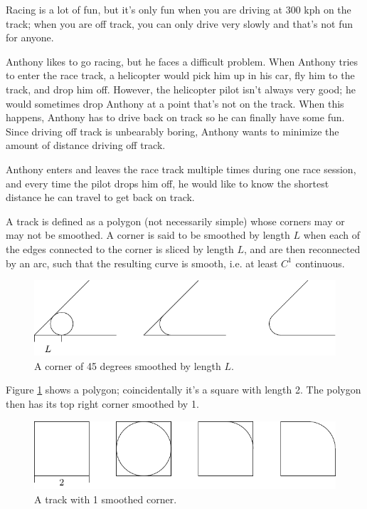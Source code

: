 
Racing is a lot of fun, but it's only fun when you are driving at 300 kph on the track; when you are off track, you can only drive very slowly and that's not fun for anyone.

Anthony likes to go racing, but he faces a difficult problem. When Anthony tries to enter the race track, a helicopter would pick him up in his car, fly him to the track, and drop him off. However, the helicopter pilot isn't always very good; he would sometimes drop Anthony at a point that's not on the track. When this happens, Anthony has to drive back on track so he can finally have some fun. Since driving off track is unbearably boring, Anthony wants to minimize the amount of distance driving off track.

Anthony enters and leaves the race track multiple times during one race session, and every time the pilot drops him off, he would like to know the shortest distance he can travel to get back on track.

A track is defined as a polygon (not necessarily simple) whose corners may or may not be smoothed. A corner is said to be smoothed by length $L$ when each of the edges connected to the corner is sliced by length $L$, and are then reconnected by an arc, such that the resulting curve is smooth, i.e. at least $C^1$ continuous.

\begin{figure}[h]
\begin{center}
\includegraphics{picture1.pdf}
\caption{A corner of 45 degrees smoothed by length $L$.}
\end{center}
\end{figure}

Figure \ref{fig:track} shows a polygon; coincidentally it's a square with length 2. The polygon then has its top right corner smoothed by 1.

\begin{figure}[h]
\begin{center}
\includegraphics{picture2.pdf}
\caption{A track with 1 smoothed corner.}
\end{center}
\label{fig:track}
\end{figure}

